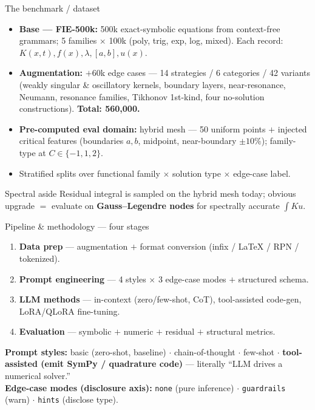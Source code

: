 \documentclass[10pt,aspectratio=169]{beamer}
\begin{document}
\begin{frame}{The benchmark / dataset}
  \begin{itemize}
    \item \textbf{Base --- FIE-500k:} 500k exact-symbolic equations from context-free grammars;
          5 families $\times$ 100k (poly, trig, exp, log, mixed). Each record: $K(x,t), f(x), \lambda, [a,b], u(x)$.
    \item \textbf{Augmentation:} $+60$k edge cases --- 14 strategies / 6 categories / 42 variants
          (weakly singular \& oscillatory kernels, boundary layers, near-resonance, Neumann,
          resonance families, Tikhonov 1st-kind, four no-solution constructions). \textbf{Total: 560{,}000.}
    \item \textbf{Pre-computed eval domain:} hybrid mesh --- 50 uniform points $+$ injected critical
          features (boundaries $a,b$, midpoint, near-boundary $\pm10\%$); family-type at $C\in\{-1,1,2\}$.
    \item Stratified splits over functional family $\times$ solution type $\times$ edge-case label.
  \end{itemize}
  \begin{block}{Spectral aside}
    Residual integral is sampled on the hybrid mesh today; obvious upgrade $=$ evaluate on
    \textbf{Gauss--Legendre nodes} for spectrally accurate $\int K u$.
  \end{block}
\end{frame}

\begin{frame}{Pipeline \& methodology --- four stages}
  \begin{enumerate}
    \item \textbf{Data prep} --- augmentation $+$ format conversion (infix / \LaTeX{} / RPN / tokenized).
    \item \textbf{Prompt engineering} --- 4 styles $\times$ 3 edge-case modes $+$ structured schema.
    \item \textbf{LLM methods} --- in-context (zero/few-shot, CoT), tool-assisted code-gen, LoRA/QLoRA fine-tuning.
    \item \textbf{Evaluation} --- symbolic $+$ numeric $+$ residual $+$ structural metrics.
  \end{enumerate}
  \vspace{4pt}
  \textbf{Prompt styles:} basic (zero-shot, baseline) $\cdot$ chain-of-thought $\cdot$ few-shot
  $\cdot$ \textbf{tool-assisted (emit SymPy / quadrature code)} --- literally ``LLM drives a numerical solver.''\\[3pt]
  \textbf{Edge-case modes (disclosure axis):} \texttt{none} (pure inference) $\cdot$
  \texttt{guardrails} (warn) $\cdot$ \texttt{hints} (disclose type).
\end{frame}
\end{document}
